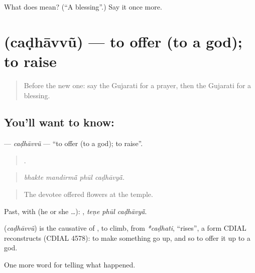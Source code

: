 \begin{tcolorbox}[breakable,colback=teal!4,colframe=teal!35!black,title={Before you move on}]
What does  mean? (\textquotedblleft{}A blessing\textquotedblright{}.) Say it once more.
\end{tcolorbox}
\section[\texorpdfstring{\gu{ચઢાવવું} (caḍhāvvũ)}{ચઢાવવું (caḍhāvvũ)}]{ (caḍhāvvũ) — to offer (to a god); to raise}

\label{lesson:GU-C331-cadhavvu}



\begin{quote}
Before the new one: say the Gujarati for a prayer, then the Gujarati for a blessing.
\end{quote}

\subsection*{You'll want to know: }
\textbf{} — \emph{caḍhāvvũ} — \textquotedblleft{}to offer (to a god); to raise\textquotedblright{}.

\begin{quote}
   .
\end{quote}

\begin{quote}
\emph{bhakte mandirmā̃ phūl caḍhāvyā̃.}
\end{quote}

\begin{quote}
The devotee offered flowers at the temple.
\end{quote}

Past, with  (he or she …):   , \emph{teṇe phūl caḍhāvyā̃}.

\begin{cousinweb}
\textbf{} (\emph{caḍhāvvũ}) is the causative of \textbf{}, to climb, from \emph{*caḍhati}, \textquotedblleft{}rises\textquotedblright{}, a form CDIAL reconstructs (CDIAL 4578): to make something go up, and so to offer it up to a god.
\end{cousinweb}

\begin{grammarlens}[title={What you've built}]
One more word for telling what happened.
\end{grammarlens}

